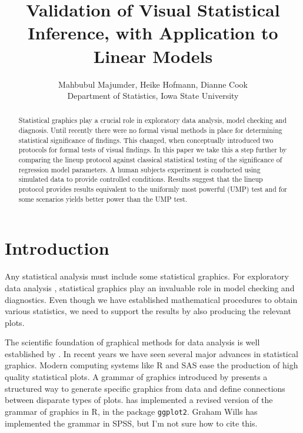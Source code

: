 \documentclass{article}
\newcommand{\blue}[1]{{\color{blue} #1}}
\begin{document}
\title{Validation of Visual Statistical Inference, with Application to Linear Models}
\author{Mahbubul Majumder, Heike Hofmann, Dianne Cook\\
        Department of Statistics, Iowa State University}
\maketitle

\begin {abstract} 
Statistical graphics play a crucial role in exploratory data analysis, model checking and diagnosis. Until recently there were no formal visual methods in place for determining statistical significance of findings. This changed, when \citet{buja:2009} conceptually introduced two protocols for formal tests of visual findings. In this paper we take this a step further by comparing the lineup protocol \citep{buja:2009} against classical statistical testing  of the significance of regression model parameters. A human subjects experiment is conducted using simulated data to provide controlled conditions. Results suggest that the lineup protocol provides results equivalent to the uniformly most powerful (UMP) test and for some scenarios yields better power than the UMP test.
\end {abstract}




\section{Introduction} Any statistical analysis must include some statistical graphics. For exploratory data analysis \cite{tukey:eda}, statistical graphics play an invaluable role in model checking and diagnostics. Even though we have established mathematical procedures to obtain various statistics, we need to support the results by also producing the relevant plots. 

The scientific foundation of graphical methods for data analysis is well established by \cite{cleveland:1984}. In recent years we have seen several major advances in statistical graphics. Modern computing systems like R and SAS ease the production of high quality statistical plots. A grammar of graphics introduced by \cite{wilkinson:1999} presents a structured way to generate specific graphics from data and define connections between disparate types of plots.  \cite{hadley:2009} has implemented a revised version of the grammar of graphics in R, in the package {\tt ggplot2}. \blue{Graham Wills has implemented the grammar in SPSS, but I'm not sure how to cite this.}
\end{document}
